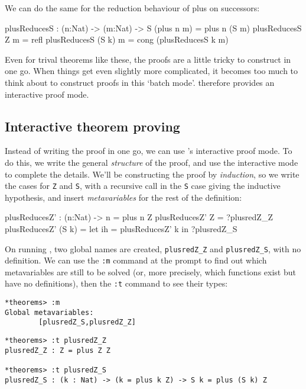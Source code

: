 \noindent
We can do the same for the reduction behaviour of plus on successors:

\begin{code}
plusReducesS : (n:Nat) -> (m:Nat) -> S (plus n m) = plus n (S m)
plusReducesS Z m = refl
plusReducesS (S k) m = cong (plusReducesS k m)
\end{code}

\noindent
Even for trival theorems like these, the proofs are a little tricky to construct in one go.
When things get even slightly more complicated, it becomes too much to think about to construct proofs in this `batch mode'.
\Idris{} therefore provides an interactive proof mode.

\subsection{Interactive theorem proving}

Instead of writing the proof in one go, we can use \Idris{}'s interactive proof mode. To do this, we write the general \emph{structure} of the proof, and use the interactive mode to complete the details.
We'll be constructing the proof by \emph{induction}, so we write the cases for \texttt{Z} and \texttt{S}, with a recursive call in the \texttt{S} case giving the inductive hypothesis, and insert \emph{metavariables} for the rest of the definition:

\begin{code}
plusReducesZ' : (n:Nat) -> n = plus n Z
plusReducesZ' Z     = ?plusredZ_Z
plusReducesZ' (S k) = let ih = plusReducesZ' k in
                      ?plusredZ_S
\end{code}

\noindent
On running \Idris{}, two global names are created, \texttt{plusredZ\_Z} and \texttt{plusredZ\_S}, with no definition.
We can use the \texttt{:m} command at the prompt to find out which metavariables are still to be solved (or, more precisely, which functions exist but have no definitions), then the \texttt{:t} command to see their types:

\begin{lstlisting}[style=stdout]
*theorems> :m
Global metavariables:
        [plusredZ_S,plusredZ_Z]

\end{lstlisting}

\begin{lstlisting}[style=stdout]
*theorems> :t plusredZ_Z
plusredZ_Z : Z = plus Z Z

*theorems> :t plusredZ_S
plusredZ_S : (k : Nat) -> (k = plus k Z) -> S k = plus (S k) Z
\end{lstlisting}

